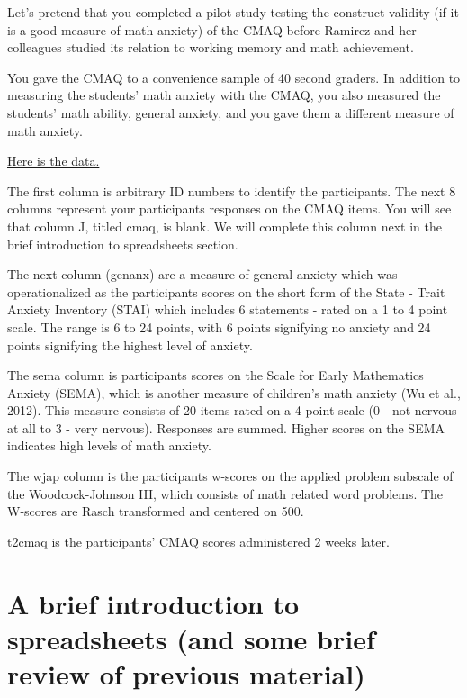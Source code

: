 \documentclass[
]{book}
\begin{document}
Let's pretend that you completed a pilot study testing the construct validity (if it is a good measure of math anxiety) of the CMAQ before Ramirez and her colleagues studied its relation to working memory and math achievement.

You gave the CMAQ to a convenience sample of 40 second graders. In addition to measuring the students' math anxiety with the CMAQ, you also measured the students' math ability, general anxiety, and you gave them a different measure of math anxiety.

\href{https://docs.google.com/spreadsheets/d/1UyfrP8h9nsyBCA-KpJAGUFFAzcHO5-RjBfJdeUULPOg/edit?usp=sharing}{Here is the data.}

The first column is arbitrary ID numbers to identify the participants. The next 8 columns represent your participants responses on the CMAQ items. You will see that column J, titled cmaq, is blank. We will complete this column next in the brief introduction to spreadsheets section.

The next column (genanx) are a measure of general anxiety which was operationalized as the participants scores on the short form of the State - Trait Anxiety Inventory (STAI) which includes 6 statements - rated on a 1 to 4 point scale. The range is 6 to 24 points, with 6 points signifying no anxiety and 24 points signifying the highest level of anxiety.

The sema column is participants scores on the Scale for Early Mathematics Anxiety (SEMA), which is another measure of children's math anxiety (Wu et al., 2012). This measure consists of 20 items rated on a 4 point scale (0 - not nervous at all to 3 - very nervous). Responses are summed. Higher scores on the SEMA indicates high levels of math anxiety.

The wjap column is the participants w-scores on the applied problem subscale of the Woodcock-Johnson III, which consists of math related word problems. The W-scores are Rasch transformed and centered on 500.

t2cmaq is the participants' CMAQ scores administered 2 weeks later.

\hypertarget{a-brief-introduction-to-spreadsheets-and-some-brief-review-of-previous-material}{%
\section{A brief introduction to spreadsheets (and some brief review of previous material)}\label{a-brief-introduction-to-spreadsheets-and-some-brief-review-of-previous-material}}
\end{document}
